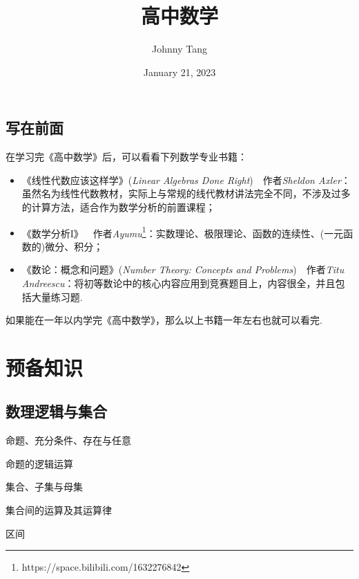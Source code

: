 \documentclass[lang=cn, zihao=5]{elegantbook}
\title{高中数学}
\author{Johnny Tang}
\institute{DEEP Team}
\date{January 21, 2023}
\begin{document}
\maketitle

\frontmatter

\mainmatter

\chapter*{写在前面}

在学习完《高中数学》后，可以看看下列数学专业书籍：

\begin{itemize}
	\item 《线性代数应该这样学》(\textit{Linear Algebras Done Right})~~作者\textit{Sheldon Axler}：虽然名为线性代数教材，实际上与常规的线代教材讲法完全不同，不涉及过多的计算方法，适合作为数学分析的前置课程；
	\item 《数学分析I》~~作者\textit{Ayumu}\footnote{https://space.bilibili.com/1632276842}：实数理论、极限理论、函数的连续性、(一元函数的)微分、积分；
	\item 《数论：概念和问题》(\textit{Number Theory: Concepts and Problems})~~作者\textit{Titu Andreescu}：将初等数论中的核心内容应用到竞赛题目上，内容很全，并且包括大量练习题.
\end{itemize}

如果能在一年以内学完《高中数学》，那么以上书籍一年左右也就可以看完.

\tableofcontents

\newpage

\part{预备知识}

\setcounter{chapter}{-1}
\chapter{数理逻辑与集合}

\begin{introduction}
	\item 命题、充分条件、存在与任意
	\item 命题的逻辑运算
	\item 集合、子集与母集
	\item 集合间的运算及其运算律
	\item 区间
\end{introduction}
\end{document}
